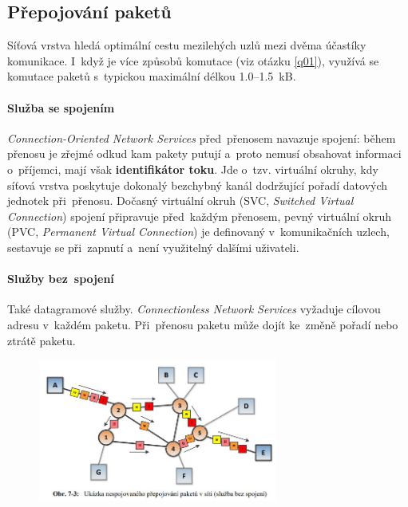 \subsection{Přepojování paketů}

Síťová vrstva hledá optimální cestu mezilehých uzlů mezi dvěma účastíky komunikace. I~když je více způsobů komutace (viz otázku \ref{q01}), využívá se komutace paketů s~typickou maximální délkou 1.0--1.5~kB.

\paragraph{Služba se spojením} \emph{Connection-Oriented Network Services} před~přenosem navazuje spojení: během přenosu je zřejmé odkud kam pakety putují a~proto nemusí obsahovat informaci o~příjemci, mají však \textbf{identifikátor toku}. Jde o~tzv. virtuální okruhy, kdy síťová vrstva poskytuje dokonalý bezchybný kanál dodržující pořadí datových jednotek při~přenosu. Dočasný virtuální okruh (SVC, \emph{Switched Virtual Connection}) spojení připravuje před~každým přenosem, pevný virtuální okruh (PVC, \emph{Permanent Virtual Connection}) je definovaný v~komunikačních uzlech, sestavuje se při~zapnutí a~není využitelný dalšími uživateli.

\paragraph{Služby bez~spojení} Také datagramové služby. \emph{Connectionless Network Services} vyžaduje cílovou adresu v~každém paketu. Při~přenosu paketu může dojít ke~změně pořadí nebo ztrátě paketu.

\begin{figure}[ht]
	\centering
	\includegraphics[width=0.7\textwidth]{images/q07_connectionless}
\end{figure}


